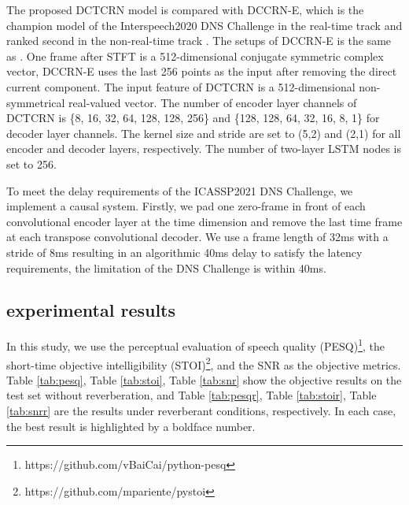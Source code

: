 \documentclass[journal,10pt]{IEEEtran}
\begin{document}
The proposed DCTCRN model is compared with DCCRN-E, which is the champion model of the Interspeech2020 DNS Challenge in the real-time track and ranked second in the non-real-time track \cite{reddy2020interspeechresults}. The setups of DCCRN-E is the same as \cite{hu2020dccrn}. One frame after STFT is a 512-dimensional conjugate symmetric complex vector, DCCRN-E uses the last 256 points as the input after removing the direct current component. The input feature of DCTCRN is a 512-dimensional non-symmetrical real-valued vector. The number of encoder layer channels of DCTCRN is \{8, 16, 32, 64, 128, 128, 256\} and \{128, 128, 64, 32, 16, 8, 1\} for decoder layer channels. The kernel size and stride are set to (5,2) and (2,1) for all encoder and decoder layers, respectively. The number of two-layer LSTM nodes is set to 256.


To meet the delay requirements of the ICASSP2021 DNS Challenge, we implement a causal system. Firstly, we pad one zero-frame in front of each convolutional encoder layer at the time dimension and remove the last time frame at each transpose convolutional decoder. We use a frame length of 32ms with a stride of 8ms resulting in an algorithmic 40ms delay to satisfy the latency requirements, the limitation of the DNS Challenge is within 40ms.

\subsection{experimental results}

In this study, we use the perceptual evaluation of speech quality (PESQ)\footnote{https://github.com/vBaiCai/python-pesq}, the short-time objective intelligibility (STOI)\footnote{https://github.com/mpariente/pystoi}, and the SNR as the objective  metrics. Table \ref{tab:pesq}, Table \ref{tab:stoi}, Table \ref{tab:snr} show the objective results on the test set without reverberation, and Table \ref{tab:pesqr}, Table \ref{tab:stoir}, Table \ref{tab:snrr} are the results under reverberant conditions, respectively. In each case, the best result is highlighted by a boldface number.
\end{document}
